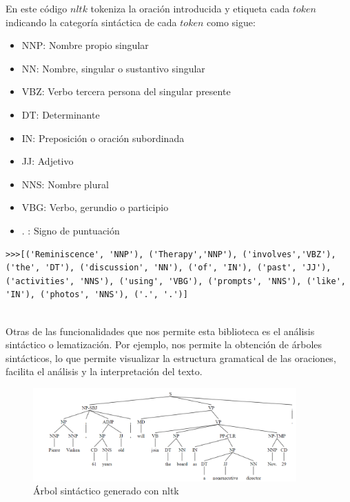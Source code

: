 En este código $nltk$ tokeniza la oración introducida y etiqueta cada $token$ indicando la categoría sintáctica de cada $token$ como sigue:

\begin{itemize}
	\item NNP: Nombre propio singular
	\item NN: Nombre, singular o sustantivo singular
	\item VBZ: Verbo tercera persona del singular presente
	\item DT: Determinante
	\item IN: Preposición o oración subordinada
	\item JJ: Adjetivo
	\item NNS: Nombre plural 
	\item VBG: Verbo, gerundio o participio
	\item . : Signo de puntuación
\end{itemize}

\begin{lstlisting}[style=SpyderStyle, caption={Tokenización y etiquetado con nltk}, captionpos=b, label={lst:python},breaklines = true]
	>>>[('Reminiscence', 'NNP'), ('Therapy','NNP'), ('involves','VBZ'), ('the', 'DT'), ('discussion', 'NN'), ('of', 'IN'), ('past', 'JJ'), ('activities', 'NNS'), ('using', 'VBG'), ('prompts', 'NNS'), ('like', 'IN'), ('photos', 'NNS'), ('.', '.')]
	
\end{lstlisting}

Otras de las funcionalidades que nos permite esta biblioteca es el análisis sintáctico o lematización. Por ejemplo, nos permite la obtención de árboles sintácticos, lo que permite visualizar la estructura gramatical de las oraciones, facilita el análisis y la interpretación del texto. \\

\begin{figure}[h]
	\centering
	\includegraphics[width=0.9\textwidth]{Imagenes/arbolsintactico}
	\caption{Árbol sintáctico generado con nltk}
	\label{fig:2}
\end{figure}

